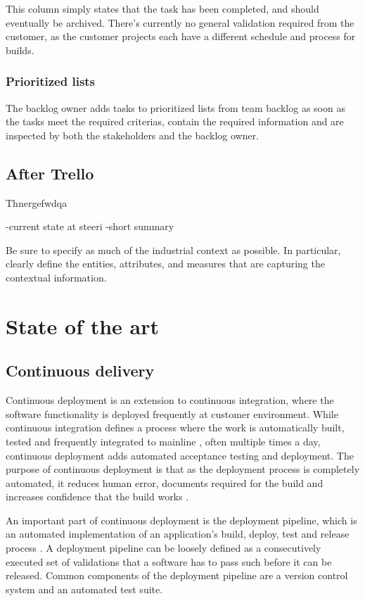 \documentclass[english]{tktltiki2}
\theoremstyle{definition}
\theoremstyle{remark}
\begin{document}
This column simply states that the task has been completed, and should eventually be archived. There’s currently no general validation required from the customer, as the customer projects each have a different schedule and process for builds.
\subsubsection{Prioritized lists}

The backlog owner adds tasks to prioritized lists from team backlog as soon as the tasks meet the required criterias, contain the required information and are inspected by both the stakeholders and the backlog owner.

\subsection{After Trello}
Thnergefwdqa

\cite{olsson2012climbing}

-current state at steeri
    -short summary

Be sure to specify as much of the industrial context as possible. In particular,
clearly deﬁne the entities, attributes, and measures that are capturing the contextual information.

\section{State of the art}

\subsection{Continuous delivery}
Continuous deployment is an extension to continuous integration, where the software functionality is deployed frequently at customer environment. While continuous integration defines a process where the work is automatically built, tested and frequently integrated to mainline \cite{fowler2006continuous}, often multiple times a day, continuous deployment adds automated acceptance testing and deployment. The purpose of continuous deployment is that as the deployment process is completely automated, it reduces human error, documents required for the build and increases confidence that the build works \cite{cdbook}. %

An important part of continuous deployment is the deployment pipeline, which is an automated implementation of an application's build, deploy, test and release process \cite{cdbook}. A deployment pipeline can be loosely defined as a consecutively executed set of validations that a software has to pass such before it can be released. Common components of the deployment pipeline are a version control system and an automated test suite.
\end{document}
